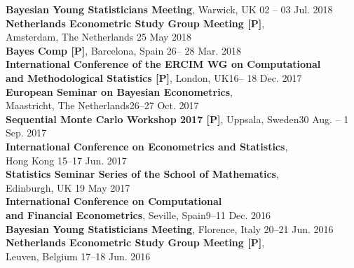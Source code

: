 \documentclass[margin,line]{resume}
\begin{document}
\begin{resume}
	\textbf{ Bayesian Young Statisticians Meeting}, Warwick, UK \hfill 02 -- 03 Jul. 2018 \vspace{1mm} \\
	\textbf{ Netherlands Econometric Study Group Meeting [P]}, \\
	Amsterdam, The Netherlands \hfill 25 May 2018  \vspace{1mm} \\ 
	\textbf{ Bayes Comp [P]}, Barcelona, Spain \hfill 26-- 28 Mar. 2018 \vspace{1mm} \\
	\textbf{ International Conference of the ERCIM WG on Computational}\\
	\textbf{and Methodological Statistics [P]}, London, UK\hfill 16-- 18 Dec. 2017 \vspace{1mm} \\ 	
	\textbf{ European Seminar on Bayesian Econometrics},\\
	 Maastricht, The Netherlands\hfill 26--27 Oct. 2017 \vspace{1mm} \\ 
	\textbf{Sequential Monte Carlo Workshop 2017 [P]}, Uppsala, Sweden\hfill 30 Aug. -- 1 Sep. 2017 \vspace{1mm} \\ 
	\textbf{ International Conference on Econometrics and Statistics},\\ Hong Kong \hfill 15--17 Jun. 2017 \vspace{1mm} \\ 
    \textbf{Statistics Seminar Series of the School of Mathematics},\\ Edinburgh, UK \hfill 19 May 2017 \vspace{1mm} \\ 
    \textbf{ International Conference on Computational \\ and Financial Econometrics},  Seville, Spain\hfill 9--11 Dec. 2016  \vspace{1mm} \\ 
	\textbf{ Bayesian Young Statisticians Meeting}, Florence, Italy \hfill 20--21 Jun. 2016  \vspace{1mm} \\ 
	\textbf{ Netherlands Econometric Study Group Meeting [P]},\\
    Leuven, Belgium \hfill 17--18 Jun. 2016  \vspace{1mm} \\ 
  



\end{resume}
\end{document}
